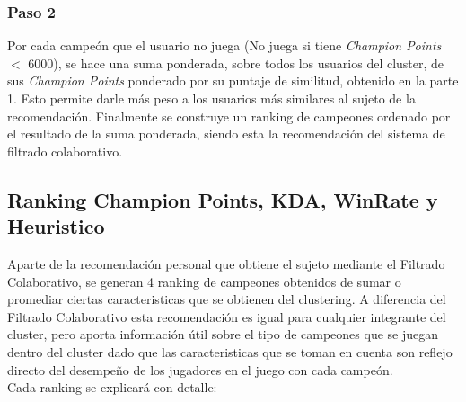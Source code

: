 \documentclass[letterpaper,11pt, spanish]{article}
\begin{document}
\subsubsection{Paso 2}

Por cada campeón que el usuario no juega (No juega si tiene \textit{Champion Points} $<$ 6000), se hace una suma ponderada, sobre todos los usuarios del cluster, de sus \textit{Champion Points} ponderado por su puntaje de similitud, obtenido en la parte 1. Esto permite darle más peso a los usuarios más similares al sujeto de la recomendación. Finalmente se construye un ranking de campeones ordenado por el resultado de la suma ponderada, siendo esta la recomendación del sistema de filtrado colaborativo. 

\subsection{Ranking Champion Points, KDA, WinRate y Heuristico}

Aparte de la recomendación personal que obtiene el sujeto mediante el Filtrado Colaborativo, se generan 4 ranking de campeones obtenidos de sumar o promediar ciertas caracteristicas que se obtienen del clustering. A diferencia del Filtrado Colaborativo esta recomendación es igual para cualquier integrante del cluster, pero aporta información útil sobre el tipo de campeones que se juegan dentro del cluster dado que las caracteristicas que se toman en cuenta son reflejo directo del desempeño de los jugadores en el juego con cada campeón.\\

Cada ranking se explicará con detalle:
\end{document}
